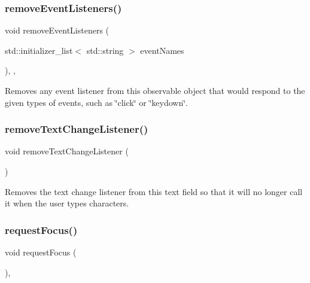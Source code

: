 \subsubsection{\texorpdfstring{remove\+Event\+Listeners()}{removeEventListeners()}}
{\footnotesize\ttfamily void remove\+Event\+Listeners (\begin{DoxyParamCaption}\item[{std\+::initializer\+\_\+list$<$ std\+::string $>$}]{event\+Names }\end{DoxyParamCaption})\hspace{0.3cm}{\ttfamily [protected]}, {\ttfamily [virtual]}, {\ttfamily [inherited]}}



Removes any event listener from this observable object that would respond to the given types of events, such as \char`\"{}click\char`\"{} or \char`\"{}keydown\char`\"{}. 

\mbox{\label{classGTextField_a69c940b99d01eb7c353763ce4b0942a4}} 
\subsubsection{\texorpdfstring{remove\+Text\+Change\+Listener()}{removeTextChangeListener()}}
{\footnotesize\ttfamily void remove\+Text\+Change\+Listener (\begin{DoxyParamCaption}{ }\end{DoxyParamCaption})\hspace{0.3cm}{\ttfamily [virtual]}}



Removes the text change listener from this text field so that it will no longer call it when the user types characters. 

\mbox{\label{classGInteractor_a519fb2ac767f8b2febbb50b898b8c8cb}} 
\subsubsection{\texorpdfstring{request\+Focus()}{requestFocus()}}
{\footnotesize\ttfamily void request\+Focus (\begin{DoxyParamCaption}{ }\end{DoxyParamCaption})\hspace{0.3cm}{\ttfamily [virtual]}, {\ttfamily [inherited]}}



